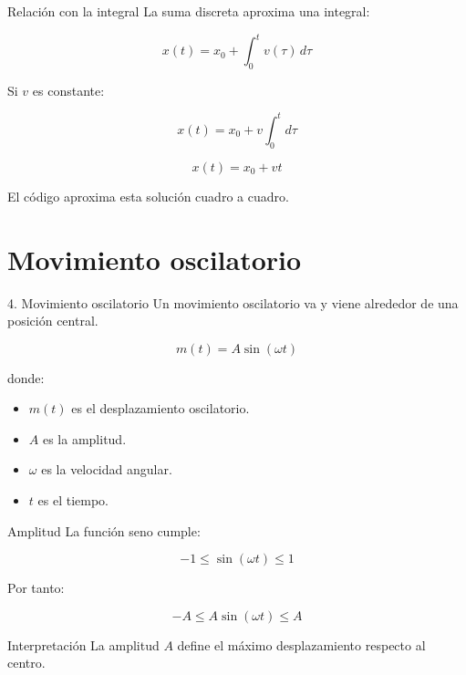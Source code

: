 \documentclass{beamer}
\begin{document}
\begin{frame}{Relación con la integral}
La suma discreta aproxima una integral:

\[
x(t)=x_0+\int_0^t v(\tau)\,d\tau
\]

\medskip

Si \(v\) es constante:

\[
x(t)=x_0+v\int_0^t d\tau
\]

\[
x(t)=x_0+vt
\]

\medskip

El código aproxima esta solución cuadro a cuadro.
\end{frame}

\section{Movimiento oscilatorio}

\begin{frame}{4. Movimiento oscilatorio}
Un movimiento oscilatorio va y viene alrededor de una posición central.

\[
m(t)=A\sin(\omega t)
\]

donde:

\begin{itemize}
    \item \(m(t)\) es el desplazamiento oscilatorio.
    \item \(A\) es la amplitud.
    \item \(\omega\) es la velocidad angular.
    \item \(t\) es el tiempo.
\end{itemize}
\end{frame}

\begin{frame}{Amplitud}
La función seno cumple:

\[
-1 \leq \sin(\omega t) \leq 1
\]

Por tanto:

\[
-A \leq A\sin(\omega t) \leq A
\]

\medskip

\begin{block}{Interpretación}
La amplitud \(A\) define el máximo desplazamiento respecto al centro.
\end{block}
\end{frame}
\end{document}
